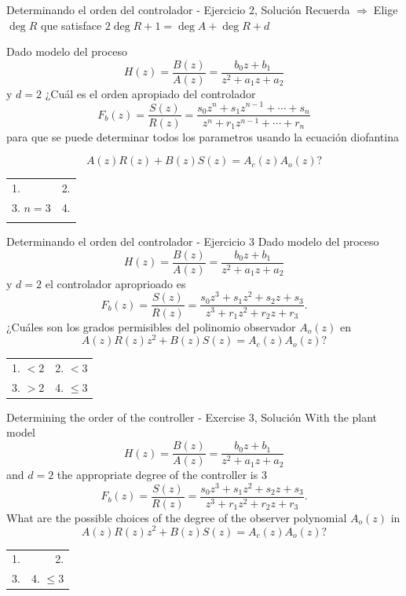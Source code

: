 \documentclass[presentation,aspectratio=169]{beamer}
\begin{document}
\begin{frame}[label={sec:orge97733e}]{Determinando el orden del controlador - Ejercicio 2, Solución}
Recuerda    \alert{\(\Rightarrow\;\)Elige \(\deg R\) que satisface \(2\deg R + 1 = \deg A + \deg R + d\)}

   Dado modelo del proceso \[H(z) = \frac{B(z)}{A(z)} = \frac{b_0z + b_1}{z^2 + a_1z + a_2}\] y \(d=2\)  ¿Cuál es el orden apropiado del controlador 
\[F_b(z) = \frac{S(z)}{R(z)} = \frac{s_0z^n + s_1z^{n-1} + \cdots + s_n}{z^n + r_1 z^{n-1} + \cdots + r_n}\]
para que se puede determinar todos los parametros usando la ecuación diofantina

\[ A(z)R(z) + B(z)S(z) = A_c(z)A_o(z)?\]

\begin{center}
\begin{tabular}{lr}
1. & 2.\\
3. \(n=3\) & 4.\\
 & \\
\end{tabular}
\end{center}
\end{frame}


\begin{frame}[label={sec:org970a812}]{Determinando el orden del controlador - Ejercicio 3}
   Dado modelo del proceso \[H(z) = \frac{B(z)}{A(z)} = \frac{b_0z + b_1}{z^2 + a_1z + a_2}\] y \(d=2\)   el controlador aproprioado es 
\[F_b(z) = \frac{S(z)}{R(z)} = \frac{s_0z^3 + s_1z^2 + s_2z + s_3}{z^3 + r_1 z^2 + r_2z + r_3}.\]
¿Cuáles son los grados permisibles del polinomio observador \(A_o(z)\) en
   \[ A(z)R(z)z^2 + B(z)S(z) = A_c(z)A_o(z)?\]

\begin{center}
\begin{tabular}{ll}
1. \(< 2\) & 2. \(< 3\)\\
3. \(> 2\) & 4. \(\le 3\)\\
\end{tabular}
\end{center}
\end{frame}

\begin{frame}[label={sec:orgc6def42}]{Determining the order of the controller - Exercise 3, Solución}
With the plant model \[H(z) = \frac{B(z)}{A(z)} = \frac{b_0z + b_1}{z^2 + a_1z + a_2}\] and \(d=2\)    the appropriate degree of the controller is 3
\[F_b(z) = \frac{S(z)}{R(z)} = \frac{s_0z^3 + s_1z^2 + s_2z + s_3}{z^3 + r_1 z^2 + r_2z + r_3}.\]
What are the possible choices of the degree of the observer polynomial \(A_o(z)\) in
\[ A(z)R(z)z^2 + B(z)S(z) = A_c(z)A_o(z)?\]
\begin{center}
\begin{tabular}{rr}
1. & 2.\\
3. & 4. \(\le 3\)\\
\end{tabular}
\end{center}
\end{frame}
\end{document}

